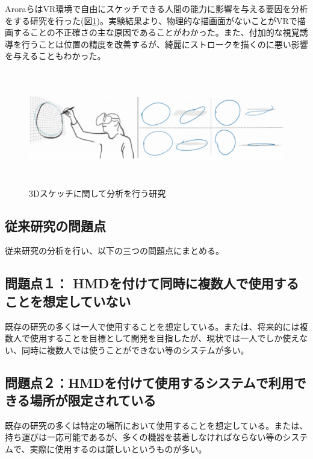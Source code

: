\documentclass[11pt,a4j, titlepage]{jarticle} %
\begin{document}
Aroraら\cite{arora}はVR環境で自由にスケッチできる人間の能力に影響を与える要因を分析をする研究を行った(図\ref{fig:evaluation_sketch})。実験結果より、物理的な描画面がないことがVRで描画することの不正確さの主な原因であることがわかった。また、付加的な視覚誘導を行うことは位置の精度を改善するが、綺麗にストロークを描くのに悪い影響を与えることもわかった。

\begin{figure}[H]
  \begin{center}
    \includegraphics[clip,height=5.0cm,width=15.0cm]{./evaluation_sketch.eps}
    \caption{3Dスケッチに関して分析を行う研究}
    \label{fig:evaluation_sketch}
  \end{center}
\end{figure}

\subsection{従来研究の問題点} \label{mondaiten}
従来研究の分析を行い、以下の三つの問題点にまとめる。

\subsection*{問題点１： HMDを付けて同時に複数人で使用することを想定していない}
既存の研究の多くは一人で使用することを想定している。または、将来的には複数人で使用することを目標として開発を目指したが、現状では一人でしか使えない、同時に複数人では使うことができない等のシステムが多い。

\subsection*{問題点２：HMDを付けて使用するシステムで利用できる場所が限定されている}
既存の研究の多くは特定の場所において使用することを想定している。または、持ち運びは一応可能であるが、多くの機器を装着しなければならない等のシステムで、実際に使用するのは厳しいというものが多い。
\end{document}
